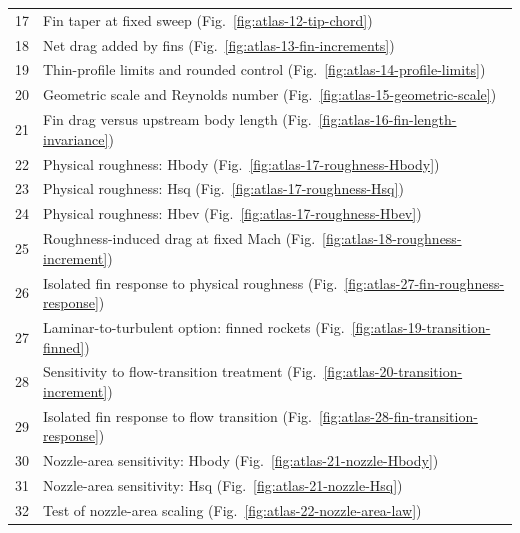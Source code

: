 \documentclass[oneside,openany]{amsdtx}
\begin{document}
{\begin{longtable}{@{}rL{.84\textwidth}@{}}
17 & Fin taper at fixed sweep (Fig.~\ref{fig:atlas-12-tip-chord})\\

18 & Net drag added by fins (Fig.~\ref{fig:atlas-13-fin-increments})\\

19 & Thin-profile limits and rounded control (Fig.~\ref{fig:atlas-14-profile-limits})\\

20 & Geometric scale and Reynolds number (Fig.~\ref{fig:atlas-15-geometric-scale})\\

21 & Fin drag versus upstream body length (Fig.~\ref{fig:atlas-16-fin-length-invariance})\\

22 & Physical roughness: Hbody (Fig.~\ref{fig:atlas-17-roughness-Hbody})\\

23 & Physical roughness: Hsq (Fig.~\ref{fig:atlas-17-roughness-Hsq})\\

24 & Physical roughness: Hbev (Fig.~\ref{fig:atlas-17-roughness-Hbev})\\

25 & Roughness-induced drag at fixed Mach (Fig.~\ref{fig:atlas-18-roughness-increment})\\

26 & Isolated fin response to physical roughness (Fig.~\ref{fig:atlas-27-fin-roughness-response})\\

27 & Laminar-to-turbulent option: finned rockets (Fig.~\ref{fig:atlas-19-transition-finned})\\

28 & Sensitivity to flow-transition treatment (Fig.~\ref{fig:atlas-20-transition-increment})\\

29 & Isolated fin response to flow transition (Fig.~\ref{fig:atlas-28-fin-transition-response})\\

30 & Nozzle-area sensitivity: Hbody (Fig.~\ref{fig:atlas-21-nozzle-Hbody})\\

31 & Nozzle-area sensitivity: Hsq (Fig.~\ref{fig:atlas-21-nozzle-Hsq})\\

32 & Test of nozzle-area scaling (Fig.~\ref{fig:atlas-22-nozzle-area-law})\\


\end{longtable}}
\end{document}

